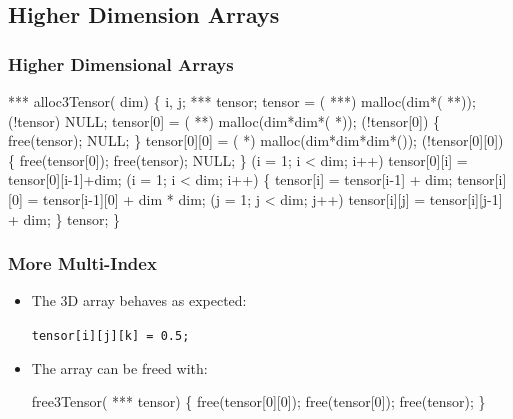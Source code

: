 \documentclass[smaller,handout,table]{beamer}
\begin{document}
\subsection{Higher Dimension Arrays}
\begin{frame}[fragile]
\frametitle{Higher Dimensional Arrays}
\begin{semiverbatim}
\tiny
\kr\kl{} *** alloc3Tensor( dim)
\kl\{
\kl   {} i, j;
\kl   {} *** tensor;
\kl   tensor = ( ***) malloc(dim*( **));
\kl   {} (!tensor)  NULL;
\kl   tensor[0] = ( **) malloc(dim*dim*( *));
\kl   {} (!tensor[0])
\kl   \{
\kl      free(tensor);
\kl      {} NULL;
\kl   \}
\kl   tensor[0][0] = ( *) malloc(dim*dim*dim*());
\kl   {} (!tensor[0][0])
\kl   \{
\kl      free(tensor[0]); free(tensor);
\kl      {} NULL;
\kl   \}
\kl   {} (i = 1; i < dim; i++)
\kl      tensor[0][i] = tensor[0][i-1]+dim;
\kl   {} (i = 1; i < dim; i++)
\kl   \{
\kl      tensor[i] = tensor[i-1] + dim;
\kl      tensor[i][0] = tensor[i-1][0] + dim * dim;
\kl      {} (j = 1; j < dim; j++)
\kl         tensor[i][j] = tensor[i][j-1] + dim;
\kl   \}
\kl   {} tensor;
\kl\}
\end{semiverbatim}
\end{frame}

\begin{frame}[fragile]
\frametitle{More Multi-Index}
\begin{itemize}
\item The 3D array behaves as expected:\\
\begin{center}
\tt tensor[i][j][k] = 0.5;
\end{center}
\item The array can be freed with:
\begin{semiverbatim}
 free3Tensor( *** tensor)
\{
   free(tensor[0][0]);
   free(tensor[0]);
   free(tensor);
\}
\end{semiverbatim}
\end{itemize}
\end{frame}
\end{document}
